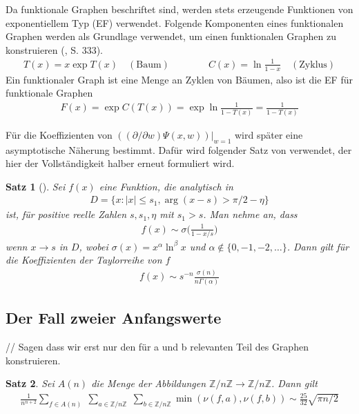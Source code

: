 \documentclass[a4paper, 10pt, ngerman]{article}
\newcommand{\Z}{\mathbb{Z}}
\newtheorem{theorem}{Satz}
\begin{document}
Da funktionale Graphen beschriftet sind, werden stets erzeugende Funktionen von exponentiellem Typ (EF) verwendet. Folgende Komponenten eines funktionalen Graphen werden als Grundlage verwendet, um einen funktionalen Graphen zu konstruieren (\cite{fo90}, S. 333).
\begin{align*}
    T(x) = x \exp T(x) \quad (\text{Baum}) \qquad\qquad C(x) = \ln \frac {1} {1 - x} \quad (\text{Zyklus})
\end{align*}
Ein funktionaler Graph ist eine Menge an Zyklen von Bäumen, also ist die EF für funktionale Graphen
\begin{align*}
    F(x) = \exp C(T(x)) = \exp \ln \frac 1 {1 - T(x)} = \frac 1 {1 - T(x)}
\end{align*}

Für die Koeffizienten von $((\partial / \partial w) \Psi(x, w)) |_{w = 1}$ wird später eine asymptotische Näherung bestimmt. Dafür wird folgender Satz von \cite{fo90} verwendet, der hier der Vollständigkeit halber erneut formuliert wird.

\begin{theorem}[\cite{fo90}]
    Sei $f(x)$ eine Funktion, die analytisch in
    \begin{align*}
        D = \{x : |x| \le s_1, \arg(x - s) > \pi/2 - \eta \}
    \end{align*}
    ist, für positive reelle Zahlen $s, s_1, \eta$ mit $s_1 > s$. Man nehme an, dass
    \begin{align*}
        f(x) \sim \sigma \bigg ( \frac 1 {1 - x/s} \bigg )
    \end{align*}
    wenn $x \to s$ in $D$, wobei $\sigma(x) = x^\alpha \ln^\beta x$ und $\alpha \notin \{0, -1, -2, \dots\}$. Dann gilt für die Koeffizienten der Taylorreihe von $f$
    \begin{align*}
        [x^n]f(x) \sim s^{-n} \frac {\sigma(n)}{n\Gamma(\alpha)}
    \end{align*}
\end{theorem}

\subsection{Der Fall zweier Anfangswerte}\label{sec:start2}

// Sagen dass wir erst nur den für a und b relevanten Teil des Graphen konstruieren.

\begin{theorem}
    Sei $A(n)$ die Menge der Abbildungen $\Z/n\Z \to \Z/n\Z$. Dann gilt
    \begin{align*}
        \frac 1 {n^{n + 2}} \sum_{f \in A(n)} \; \sum_{a \in \Z/n\Z} \; \sum_{b \in \Z/n\Z} \min(\nu(f, a), \nu(f, b)) \sim \frac {25} {32} \sqrt{\pi n / 2}
    \end{align*}
\end{theorem}
\end{document}
